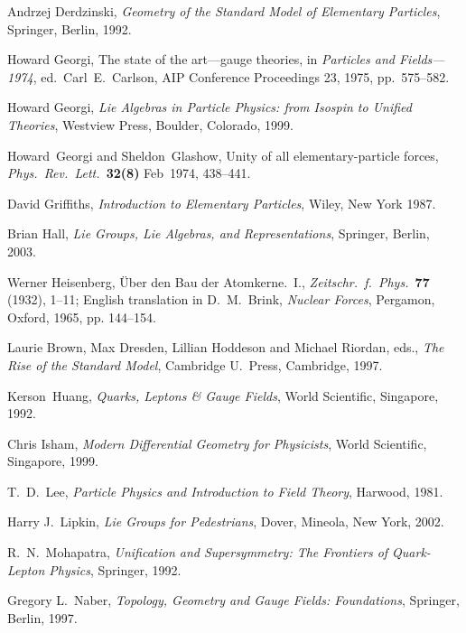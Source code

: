 \documentclass{article}
\begin{document}
\begin{thebibliography}{99}
Andrzej Derdzinski, {\em {Geometry of the Standard Model of Elementary
Particles}}, Springer, Berlin, 1992.

Howard Georgi, The state of the art---gauge theories, in {\em Particles and
Fields---1974}, ed.\ Carl\ E.\ Carlson, AIP Conference Proceedings 23, 1975,
pp.\  575--582.

Howard Georgi, {\em {Lie Algebras in Particle Physics: from 
Isospin to Unified Theories}}, Westview Press, Boulder, Colorado, 1999. 

Howard\ Georgi and Sheldon\ Glashow, Unity of all elementary-particle forces,
{\em Phys.\ Rev.\ Lett.\ }{\bf 32(8)} {Feb\ 1974}, 438--441. 

David Griffiths, {\em {Introduction to Elementary Particles}}, Wiley, New
York 1987.

Brian Hall, {\em {Lie Groups, Lie Algebras, and Representations}}, 
Springer, Berlin, 2003. 

 Werner Heisenberg, \"Uber den Bau der Atomkerne.\ I., {\em {Zeitschr.\ f.\ Phys.\
}}{\bf 77} (1932), 1--11; English translation in D.\ M.\ Brink, {\em {Nuclear
Forces}}, Pergamon, Oxford, 1965, pp. 144--154.

 Laurie Brown, Max Dresden, Lillian Hoddeson and 
Michael Riordan, eds., {\em {The Rise of the Standard Model}}, 
Cambridge U.\ Press, Cambridge, 1997.
 
Kerson\ Huang, {\em {Quarks, Leptons \& Gauge Fields}}, World Scientific,
Singapore, 1992.

Chris Isham, {\em {Modern Differential Geometry for Physicists}}, 
World Scientific, Singapore, 1999.

T.\ D.\ Lee, {\em {Particle Physics and Introduction to Field Theory}}, 
Harwood, 1981.

Harry J.\ Lipkin, {\em {Lie Groups for Pedestrians}}, Dover, Mineola,
New York, 2002.

R.\ N.\ Mohapatra, {\em {Unification and Supersymmetry: The Frontiers of
Quark-Lepton Physics}}, Springer, 1992.

Gregory L.\ Naber, {\em{Topology, Geometry and Gauge Fields: Foundations}}, 
Springer, Berlin, 1997. 


\end{thebibliography}
\end{document}
